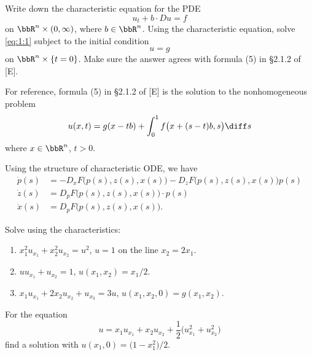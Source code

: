 \begin{problem}
  Write down the characteristic equation for the PDE
  \[
    \label{eq:1:1}
    \tag{\(*\)}
    u_t+b\cdot Du=f
  \]
  on \(\bbR^n\times(0,\infty)\), where \(b\in\bbR^n\). Using the
  characteristic equation, solve \eqref{eq:1:1} subject to the initial
  condition
  \[
    u=g
  \]
  on \(\bbR^n\times\{t=0\}\). Make sure the answer agrees with formula (5)
  in \S 2.1.2 of [E].
\end{problem}
\begin{solution}
  For reference, formula (5) in \S 2.1.2 of [E] is the solution to the
  nonhomogeneous problem
  \[
    u(x,t)=g(x -tb)+\int_0^1 f\bigl(x+(s-t)b,s\bigr)\diff s
  \]
  where \(x\in\bbR^n\), \(t>0\).

  Using the structure of characteristic ODE, we have
  \begin{align*}
    \dot p(s)
    &=-D_xF\bigl(p(s),z(s),x(s)\bigr)-D_zF\bigl(p(s),z(s),x(s)\bigr)p(s)\\
    \dot z(s)
    &=D_pF\bigl(p(s),z(s),x(s)\bigr)\cdot p(s)\\
    \dot x(s)
    &=D_pF\bigl(p(s),z(s),x(s)\bigr).
  \end{align*}
\end{solution}
\newpage

\begin{problem}
  Solve using the characteristics:
  \begin{enumerate}[label=(\alph*)]
  \item \(x_1^2u_{x_1}+x_2^2u_{x_2}=u^2\), \(u=1\) on the line
    \(x_2=2x_1\).
  \item \(uu_{x_1}+u_{x_2}=1\), \(u(x_1,x_2)=x_1/2\).
  \item \(x_1u_{x_1}+2x_2u_{x_2}+u_{x_3}=3u\),
    \(u(x_1,x_2,0)=g(x_1,x_2)\).
  \end{enumerate}
\end{problem}
\begin{solution}

\end{solution}
\newpage

\begin{problem}
  For the equation
  \[
    u=x_1u_{x_1}+x_2u_{x_2}
    +\frac{1}{2}\bigl(u_{x_1}^2+u_{x_2}^2\bigr)
  \]
  find a solution with \(u(x_1,0)=\bigl(1-x_1^2\bigr)/2\).
\end{problem}
\begin{solution}

\end{solution}


